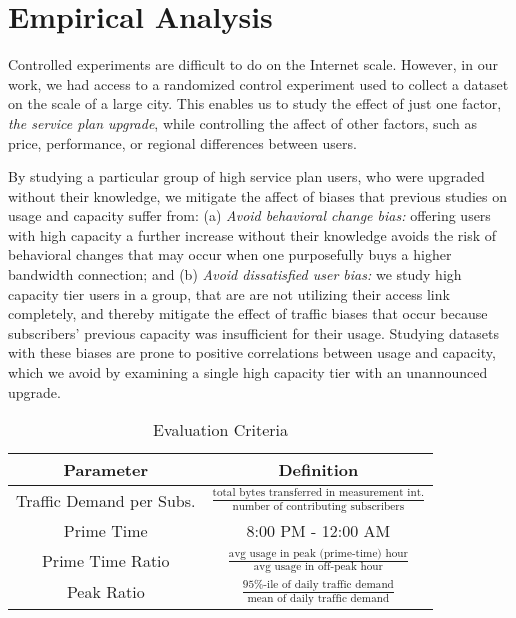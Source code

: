 \section{Empirical Analysis}\label{sec:analysis}


Controlled experiments are difficult to do on the Internet scale. However, in 
our work, we had access to a randomized control experiment used to collect a 
dataset on the scale of a large city. This enables us to study the effect of 
just one factor, \emph{the service plan upgrade}, while controlling the affect 
of other factors, such as price, performance, or regional differences between 
users.

By studying a particular group of high service plan users, who were 
upgraded without their knowledge, we mitigate the affect of biases that 
previous studies on usage and capacity suffer from: (a) \emph{Avoid behavioral 
change bias:} offering users with high capacity a further increase without 
their knowledge avoids the risk of behavioral changes that may occur when one 
purposefully buys a higher bandwidth connection; and (b) \emph{Avoid 
dissatisfied user bias:} we study high capacity tier users in a \control{} 
group, that are are not utilizing their access link completely, and thereby 
mitigate the effect of traffic biases that occur because subscribers' previous 
capacity was insufficient for their usage. Studying datasets with these biases 
are prone to positive correlations between usage and capacity, which we 
avoid by examining a single high capacity tier with an unannounced upgrade.

\begin{table}[ht]
\small 
\begin{tabular}{| c | c |}\hline
\textbf{Parameter} & \textbf{Definition}	\\\hline
Traffic Demand per Subs.& \(\frac{\text{total bytes transferred in 
measurement int.}}{\text{number of contributing subscribers}}\)	\\
Prime Time		& 8:00 PM - 12:00 AM   		\\
Prime Time Ratio 	& \( \frac{ \text{avg usage in peak (prime-time) 
hour}}{ \text{avg usage in off-peak hour}}\) 		\\
Peak Ratio 		& \(\frac{\text{95\%-ile of daily traffic 
demand}}{\text{mean of daily traffic demand}}\)	\\\hline
\end{tabular}
\caption{Evaluation Criteria}
\label{tab:eval-criteria}
\end{table}


